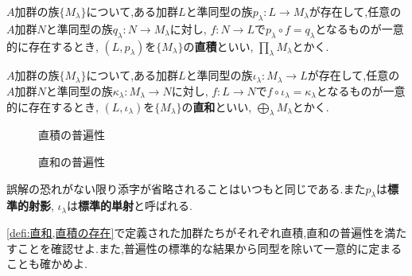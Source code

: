 \begin{defi}[普遍性を用いた直積の定義]
	$A$加群の族$\{M_\lambda\}$について,ある加群$L$と準同型の族$p_\lambda:L\to M_\lambda$が存在して,任意の$A$加群$N$と準同型の族$q_\lambda:N\to M_\lambda$に対し, $f:N\to L$で$p_\lambda\circ f=q_\lambda$となるものが一意的に存在するとき, $(L,p_\lambda)$を$\{M_\lambda\}$の\textbf{直積}といい, $\prod_\lambda M_\lambda$とかく.
\end{defi}

\begin{defi}[普遍性を用いた直和の定義]
	$A$加群の族$\{M_\lambda\}$について,ある加群$L$と準同型の族$\iota_\lambda: M_\lambda\to L$が存在して,任意の$A$加群$N$と準同型の族$\kappa_\lambda: M_\lambda\to N$に対し, $f:L\to N$で$f\circ\iota_\lambda=\kappa_\lambda$となるものが一意的に存在するとき, $(L,\iota_\lambda)$を$\{M_\lambda\}$の\textbf{直和}といい, $\bigoplus_\lambda M_\lambda$とかく.
\end{defi}

\begin{minipage}{.45\textwidth}
	\begin{figure}[H]
		\centering
		\caption{直積の普遍性}
	\end{figure}
\end{minipage}
\hfill
\begin{minipage}{.45\textwidth}
	\begin{figure}[H]
		\centering
		\caption{直和の普遍性}
	\end{figure}
\end{minipage}

誤解の恐れがない限り添字が省略されることはいつもと同じである.また$p_\lambda$は\textbf{標準的射影}, $\iota_\lambda$は\textbf{標準的単射}と呼ばれる.

\begin{exer}
\ref{defi:直和,直積の存在}で定義された加群たちがそれぞれ直積,直和の普遍性を満たすことを確認せよ.また,普遍性の標準的な結果から同型を除いて一意的に定まることも確かめよ.
\end{exer}

